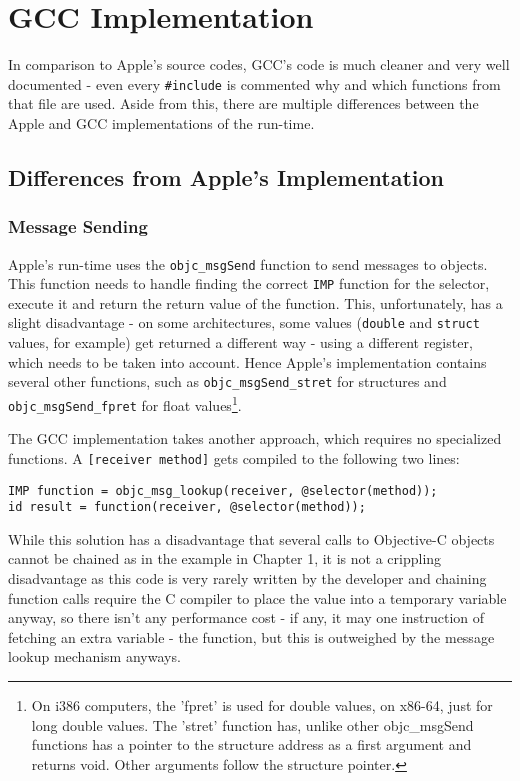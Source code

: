 \chapter{GCC Implementation}

In comparison to Apple's source codes, GCC's code is much cleaner and very well documented - even every \verb=#include= is commented why and which functions from that file are used. Aside from this, there are multiple differences between the Apple and GCC implementations of the run-time.

\section{Differences from Apple's Implementation}
\subsection{Message Sending}
Apple's run-time uses the \verb=objc_msgSend= function to send messages to objects. This function needs to handle finding the correct \verb=IMP= function for the selector, execute it and return the return value of the function. This, unfortunately, has a slight disadvantage - on some architectures, some values (\verb=double= and \verb=struct= values, for example) get returned a different way - using a different register, which needs to be taken into account. Hence Apple's implementation contains several other functions, such as \verb=objc_msgSend_stret= for structures and \verb=objc_msgSend_fpret= for float values\footnote{On i386 computers, the 'fpret' is used for double values, on x86-64, just for long double values. The 'stret' function has, unlike other objc\_msgSend functions has a pointer to the structure address as a first argument and returns void. Other arguments follow the structure pointer.}.

The GCC implementation takes another approach, which requires no specialized functions. A \verb=[receiver method]= gets compiled to the following two lines:

\begin{verbatim}
IMP function = objc_msg_lookup(receiver, @selector(method));
id result = function(receiver, @selector(method));
\end{verbatim}

While this solution has a disadvantage that several calls to Objective-C objects cannot be chained as in the example in Chapter 1, it is not a crippling disadvantage as this code is very rarely written by the developer and chaining function calls require the C compiler to place the value into a temporary variable anyway, so there isn't any performance cost - if any, it may one instruction of fetching an extra variable - the function, but this is outweighed by the message lookup mechanism anyways.

